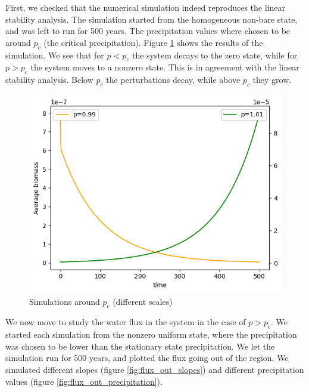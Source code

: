 \documentclass{article}
\numberwithin{equation}{section}
\begin{document}
First, we checked that the numerical simulation indeed reproduces the linear stability analysis. The simulation started from the homogeneous non-bare state, and was left to run for 500 years. The precipitation values where chosen to be around $p_c$ (the critical precipitation). Figure \ref{fig:critical_point} shows the results of the simulation. We see that for $p<p_c$ the system decays to the zero state, while for $p>p_c$ the system moves to a nonzero state. This is in agreement with the linear stability analysis. Below $p_c$ the perturbations decay, while above $p_c$ they grow.
\begin{figure}[!ht]
    \centering
    \includegraphics[scale=0.5]{plots/critical point.png}
    \caption{Simulations around $p_c$ (different scales)}
    \label{fig:critical_point}
\end{figure}

We now move to study the water flux in the system in the case of $p>p_c$. We started each simulation from the nonzero uniform state, where the precipitation was chosen to be lower than the stationary state precipitation.
We let the simulation run for 500 years, and plotted the flux going out of the region.
We simulated different slopes (figure \ref{fig:flux_out_slopes}) and different precipitation values (figure \ref{fig:flux_out_precipitation}).
\end{document}
